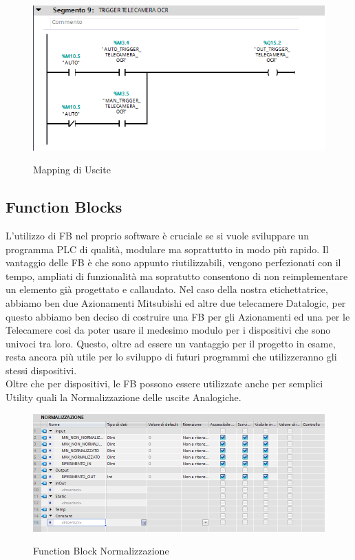 \documentclass[12pt, a4paper, oneside]{book}
\begin{document}
	\begin{figure}[H]
	\centering
	\includegraphics[width=12cm]{Immagini/OUT}
	\label{OUT}
	\caption{Mapping di Uscite}
\end{figure}



\subsection{Function Blocks}
L'utilizzo di FB nel proprio software è cruciale se si vuole sviluppare un programma PLC di qualità, modulare ma soprattutto in modo più rapido. Il vantaggio delle FB è che sono appunto riutilizzabili, vengono perfezionati con il tempo, ampliati di funzionalità ma sopratutto consentono di non reimplementare un elemento già progettato e callaudato. Nel caso della nostra etichettatrice, abbiamo ben due Azionamenti Mitsubishi ed altre due telecamere Datalogic, per questo abbiamo ben deciso di costruire una FB per gli Azionamenti ed una per le Telecamere così da poter usare il medesimo modulo per i dispositivi che sono univoci tra loro. Questo, oltre ad essere un vantaggio per il progetto in esame, resta ancora più utile per lo sviluppo di futuri programmi che utilizzeranno gli stessi dispositivi.
\\Oltre che per dispositivi, le FB possono essere utilizzate anche per semplici Utility quali la Normalizzazione delle uscite Analogiche.


	\begin{figure}[H]
	\centering
	\includegraphics[width=12cm]{Immagini/FB1}
	\label{FB1}
	\caption{Function Block Normalizzazione}
\end{figure}
\end{document}
